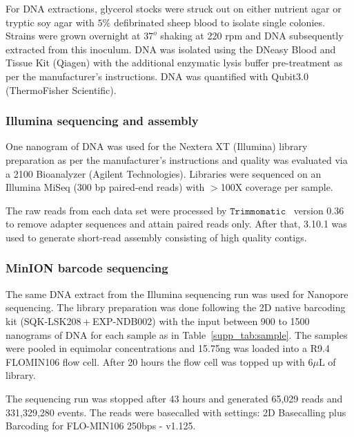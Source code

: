 For DNA extractions, glycerol stocks were struck out on either nutrient agar or tryptic soy agar with $5\%$ defibrinated sheep blood to isolate single colonies. Strains were grown overnight at $37^o$ shaking at 220 rpm and DNA subsequently extracted from this inoculum. DNA was isolated using the DNeasy Blood and Tissue Kit (Qiagen) with the additional enzymatic lysis buffer pre-treatment as per the manufacturer’s instructions. DNA was quantified with Qubit3.0 (ThermoFisher Scientific).
\subsubsection{Illumina sequencing and assembly}
One nanogram of DNA was used for the Nextera XT (Illumina) library preparation as per the manufacturer’s instructions and quality was evaluated via a 2100 Bioanalyzer (Agilent Technologies). Libraries were sequenced on an Illumina MiSeq (300 bp paired-end reads) with $>$100X coverage per sample.

The raw reads from each data set were processed by  $\mathtt{Trimmomatic}$~\cite{BolgerLU2014} version 0.36 to remove adapter sequences and attain paired reads only. After that, \spades{} 3.10.1 was used to generate short-read assembly consisting of high quality contigs.
\subsubsection{MinION barcode sequencing}
The same DNA extract from the Illumina sequencing run was used for Nanopore sequencing. The library preparation was done following the 2D native barcoding kit (SQK-LSK208 + EXP-NDB002) with the input between 900 to 1500 nanograms of DNA for each sample as in Table~\ref{supp_tab:sample}. 
The samples were pooled in equimolar concentrations and 15.75ng was loaded into a R9.4 FLOMIN106 flow cell. After 20 hours the flow cell was topped up with 6$\mu$L of library.

The sequencing run was stopped after 43 hours and generated 65,029 reads and 331,329,280 events. The reads were basecalled with settings: 2D Basecalling plus Barcoding for FLO-MIN106 250bps - v1.125.
